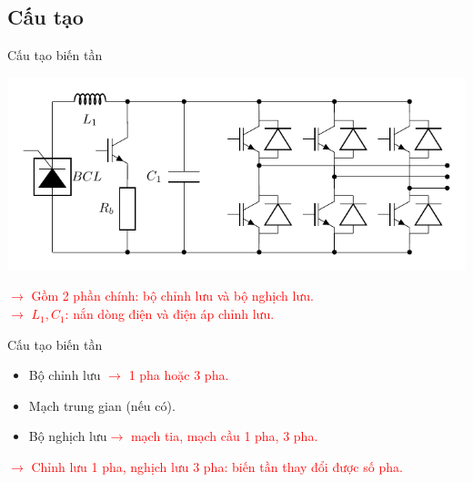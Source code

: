 \documentclass[14pt]{beamer}
\newcommand{\giaithich}[1]{\textcolor{red}{$\longrightarrow$ #1}}
\begin{document}
\subsection*{Cấu tạo}
\begin{frame}{Cấu tạo biến tần}
	\vspace{-1.5cm}
	\begin{flushleft}
		\includegraphics[scale=1]{images-chude3/bientan.pdf}
	\end{flushleft}
	\giaithich{Gồm 2 phần chính: bộ chỉnh lưu và bộ nghịch lưu.}\\
	\giaithich{$L_1, C_1$: nắn dòng điện và điện áp chỉnh lưu.}
\end{frame}

\begin{frame}{Cấu tạo biến tần}
	\begin{itemize}
		\item Bộ chỉnh lưu \giaithich{1 pha hoặc 3 pha.}
		\item Mạch trung gian (nếu có).
		\item Bộ nghịch lưu\giaithich{mạch tia, mạch cầu 1 pha, 3 pha.}
	\end{itemize}
	\giaithich{Chỉnh lưu 1 pha, nghịch lưu 3 pha: biến tần thay đổi được số pha.}
\end{frame}
\end{document}
